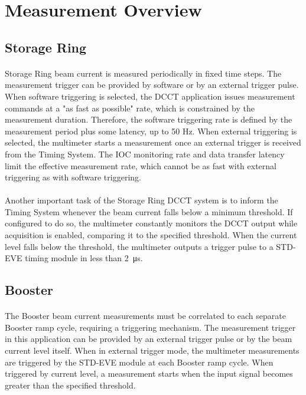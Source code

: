 \documentclass[openany]{article}
\begin{document}
\section{Measurement Overview}

	\subsection{Storage Ring} 

		\paragraph{} Storage Ring beam current is measured periodically in fixed time steps. The measurement trigger can be provided by software or by an external trigger pulse. When software triggering is selected, the DCCT application issues measurement commands at a "as fast as possible" rate, which is constrained by the measurement duration. Therefore, the software triggering rate is defined by the measurement period plus some latency, up to 50 Hz. When external triggering is selected, the multimeter starts a measurement once an external trigger is received from the Timing System. The IOC monitoring rate and data transfer latency limit the effective measurement rate, which cannot be as fast with external triggering as with software triggering.

		\paragraph{} Another important task of the Storage Ring DCCT system is to inform the Timing System whenever the beam current falls below a minimum threshold. If configured to do so, the multimeter constantly monitors the DCCT output while acquisition is enabled, comparing it to the specified threshold. When the current level falls below the threshold, the multimeter outputs a trigger pulse to a STD-EVE timing module in less than \SI{2}{\micro\second}.

	\subsection{Booster} 

		\paragraph{} The Booster beam current measurements must be correlated to each separate Booster ramp cycle, requiring a triggering mechanism. The measurement trigger in this application can be provided by an external trigger pulse or by the beam current level itself. When in external trigger mode, the multimeter measurements are triggered by the STD-EVE module at each Booster ramp cycle. When triggered by current level, a measurement starts when the input signal becomes greater than the specified threshold.
\end{document}
